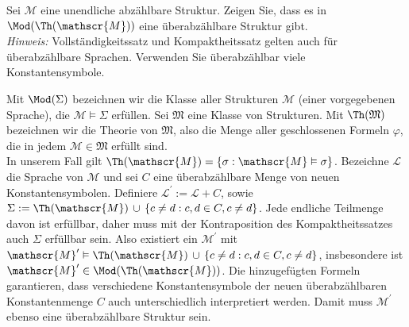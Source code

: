 
\begin{exercise}[130]

Sei $\mathscr{M}$ eine unendliche abzählbare Struktur. Zeigen Sie, dass es in
$\Mod(\Th(\mathscr{M}))$ eine überabzählbare Struktur gibt. \\
\textit{Hinweis:} Vollständigkeitssatz und Kompaktheitssatz gelten auch für
überabzählbare Sprachen. Verwenden Sie überabzählbar viele Konstantensymbole.

\end{exercise}


\begin{solution}
Mit $\Mod(\Sigma)$ bezeichnen wir die Klasse aller Strukturen $\mathscr{M}$
(einer vorgegebenen Sprache), die $\mathscr{M} \vDash \Sigma$ erfüllen.
Sei $\mathfrak{M}$ eine Klasse von Strukturen. Mit $\Th(\mathfrak{M})$ bezeichnen
wir die Theorie von $\mathfrak{M}$, also die Menge aller geschlossenen Formeln $\varphi$,
die in jedem $\mathscr{M} \in \mathfrak{M}$ erfüllt sind. \\
In unserem Fall gilt $\Th(\mathscr{M}) = \{\sigma: \mathscr{M} \vDash \sigma\}$.
Bezeichne $\mathscr{L}$ die Sprache von $\mathscr{M}$ und sei $C$ eine überabzählbare
Menge von neuen Konstantensymbolen. Definiere $\mathscr{L}^{\prime} := \mathscr{L} + C$, sowie
$\Sigma := \Th(\mathscr{M})\, \cup\, \{c \neq d: c,d \in C, c \neq d \}$.
Jede endliche Teilmenge davon ist erfüllbar, daher muss mit der Kontraposition
des Kompaktheitssatzes auch $\Sigma$ erfüllbar sein. Also existiert ein $\mathscr{M}^{\prime}$
mit $\mathscr{M}^{\prime} \vDash \Th(\mathscr{M})\, \cup\, \{c \neq d: c,d \in C, c \neq d \}$,
insbesondere ist $\mathscr{M}^{\prime} \in \Mod(\Th(\mathscr{M}))$.
Die hinzugefügten Formeln garantieren, dass verschiedene Konstantensymbole der
neuen überabzählbaren Konstantenmenge $C$ auch unterschiedlich interpretiert werden.
Damit muss $\mathscr{M}^{\prime}$ ebenso eine überabzählbare Struktur sein.

\end{solution}

